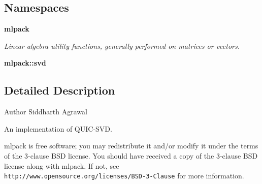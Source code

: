 \subsection*{Namespaces}
\begin{DoxyCompactItemize}
\item 
 {\bf mlpack}
\begin{DoxyCompactList}\small\item\em Linear algebra utility functions, generally performed on matrices or vectors. \end{DoxyCompactList}\item 
 {\bf mlpack\+::svd}
\end{DoxyCompactItemize}


\subsection{Detailed Description}
\begin{DoxyAuthor}{Author}
Siddharth Agrawal
\end{DoxyAuthor}
An implementation of Q\+U\+I\+C-\/\+S\+VD.

mlpack is free software; you may redistribute it and/or modify it under the terms of the 3-\/clause B\+SD license. You should have received a copy of the 3-\/clause B\+SD license along with mlpack. If not, see {\tt http\+://www.\+opensource.\+org/licenses/\+B\+S\+D-\/3-\/\+Clause} for more information. 